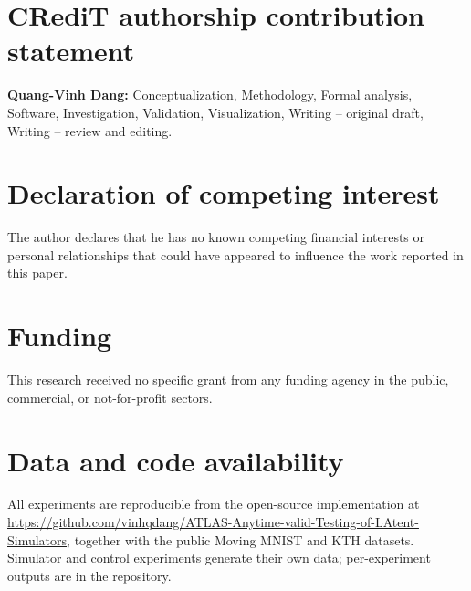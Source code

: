 \section*{CRediT authorship contribution statement}
\textbf{Quang-Vinh Dang:} Conceptualization, Methodology, Formal analysis, Software, Investigation, Validation, Visualization, Writing -- original draft, Writing -- review and editing.

\section*{Declaration of competing interest}
The author declares that he has no known competing financial interests or personal relationships that could have appeared to influence the work reported in this paper.

\section*{Funding}
This research received no specific grant from any funding agency in the public, commercial, or not-for-profit sectors.

\section*{Data and code availability}
All experiments are reproducible from the open-source implementation at \url{https://github.com/vinhqdang/ATLAS-Anytime-valid-Testing-of-LAtent-Simulators}, together with the public Moving MNIST and KTH datasets. Simulator and control experiments generate their own data; per-experiment outputs are in the repository.

